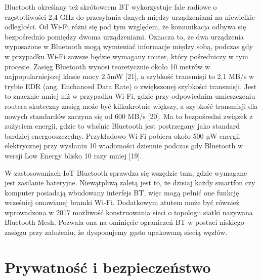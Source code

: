 \documentclass[12pt, twoside, openany]{mwrep}
\begin{document}
Bluetooth określany też skrótowcem BT wykorzystuje fale radiowe o częstotliwości 2,4 GHz do przesyłania danych między urządzeniami na niewielkie odległości. Od Wi-Fi różni się pod tym względem, że komunikacja odbywa się bezpośrednio pomiędzy dwoma urządzeniami. Oznacza to, że dwa urządzenia wyposażone w Bluetooth mogą wymieniać informacje między sobą, podczas gdy w przypadku Wi-Fi zawsze będzie wymagany router, który pośredniczy w tym procesie. Zasięg Bluetooth wynosi teoretycznie około 10 metrów w najpopularniejszej klasie mocy 2.5mW [21], a szybkość transmisji to 2.1 MB/s w trybie EDR (ang. Enchanced Data Rate) o zwiększonej szybkości transmisji.  Jest to znacznie mniej niż w przypadku Wi-Fi, gdzie przy odpowiednim umieszczeniu routera skuteczny zasięg może być kilkukrotnie większy, a szybkość transmisji dla nowych standardów zaczyna się od 600 MB/s [20]. Ma to bezpośredni związek z zużyciem energii, gdzie to właśnie Bluetooth jest postrzegany jako standard bardziej energooszczędny. Przykładowo Wi-Fi pobiera około 500 µW energii elektrycznej przy wysłaniu 10 wiadomości dziennie podczas gdy Bluetooth w wersji Low Energy blisko 10 razy mniej [19].
\par
W zastosowaniach IoT Bluetooth sprawdza się wszędzie tam, gdzie wymagane jest zasilanie bateryjne. Niewątpliwą zaletą jest to, że dzisiaj każdy smartfon czy komputer posiadają wbudowany interfejs BT, więc mogą pełnić one funkcję wcześniej omawianej bramki Wi-Fi. Dodatkowym atutem może być również wprowadzona w 2017 możliwość konstruowania sieci o topologii siatki nazywana Bluetooth Mesh. Pozwala ona na ominięcie ograniczeń BT w postaci niskiego zasięgu przy założeniu, że dysponujemy gęsto upakowaną siecią węzłów. 

\section{Prywatność i bezpieczeństwo}
\end{document}
